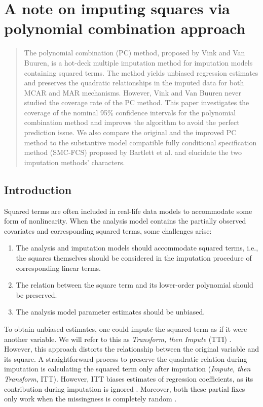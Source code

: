 \chapter{A note on imputing squares via polynomial combination approach}
\label{chap2}
	\begin{abstract}
		The polynomial combination (PC) method, proposed by Vink and Van Buuren, is a hot-deck multiple imputation method for imputation models containing squared terms. The method yields unbiased regression estimates and preserves the quadratic relationships in the imputed data for both MCAR and MAR mechanisms. However, Vink and Van Buuren never studied the coverage rate of the PC method. This paper investigates the coverage of the nominal 95\% confidence intervals for the polynomial combination method and improves the algorithm to avoid the perfect prediction issue. We also compare the original and the improved PC method to the substantive model compatible fully conditional specification method (SMC-FCS) proposed by Bartlett et al. and elucidate the two imputation methods' characters. 
	\end{abstract}

	\section{Introduction}
	Squared terms are often included in real-life data models to accommodate some form of nonlinearity. When the analysis model contains the partially observed covariates and corresponding squared terms, some challenges arise:  
	\begin{enumerate}
		\item The analysis and imputation models should accommodate squared terms, i.e., the squares themselves should be considered in the imputation procedure of corresponding linear terms.
		\item The relation between the square term and its lower-order polynomial should be preserved.
		\item The analysis model parameter estimates should be unbiased.
	\end{enumerate}
	
	To obtain unbiased estimates, one could impute the squared term as if it were another variable. We will refer to this as \textit{Transform, then Impute} (TTI) \citep{vonhippe2009}. However, this approach distorts the relationship between the original variable and its square. A straightforward process to preserve the quadratic relation during imputation is calculating the squared term only after imputation (\textit{Impute, then Transform}, ITT). However, ITT biases estimates of regression coefficients, as its contribution during imputation is ignored \citep{vonhippe2009, Vink2013}. Moreover, both these partial fixes only work when the missingness is completely random \citep{seaman2012multiple}.
	
